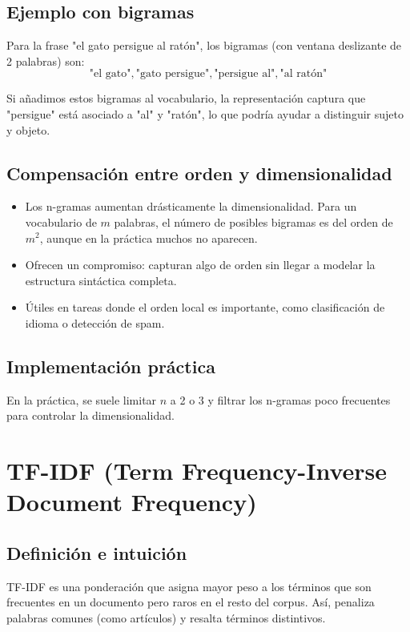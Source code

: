 \documentclass[12pt,a4paper,openany,oneside]{book}
\begin{document}
\subsection{Ejemplo con bigramas}
Para la frase "el gato persigue al ratón", los bigramas (con ventana deslizante de 2 palabras) son:
\[
\text{"el gato"}, \text{"gato persigue"}, \text{"persigue al"}, \text{"al ratón"}
\]

Si añadimos estos bigramas al vocabulario, la representación captura que "persigue" está asociado a "al" y "ratón", lo que podría ayudar a distinguir sujeto y objeto.

\subsection{Compensación entre orden y dimensionalidad}
\begin{itemize}
    \item Los n-gramas aumentan drásticamente la dimensionalidad. Para un vocabulario de \(m\) palabras, el número de posibles bigramas es del orden de \(m^2\), aunque en la práctica muchos no aparecen.
    \item Ofrecen un compromiso: capturan algo de orden sin llegar a modelar la estructura sintáctica completa.
    \item Útiles en tareas donde el orden local es importante, como clasificación de idioma o detección de spam.
\end{itemize}

\subsection{Implementación práctica}
En la práctica, se suele limitar \(n\) a 2 o 3 y filtrar los n-gramas poco frecuentes para controlar la dimensionalidad.

\section{TF-IDF (Term Frequency-Inverse Document Frequency)}

\subsection{Definición e intuición}
TF-IDF es una ponderación que asigna mayor peso a los términos que son frecuentes en un documento pero raros en el resto del corpus. Así, penaliza palabras comunes (como artículos) y resalta términos distintivos.
\end{document}
